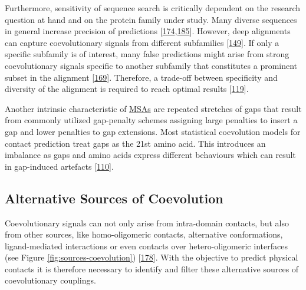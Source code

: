 \documentclass[11pt,a4paper,twoside]{book}
\theoremstyle{definition}
\theoremstyle{definition}
\theoremstyle{remark}
\begin{document}
Furthermore, sensitivity of sequence search is critically dependent on
the research question at hand and on the protein family under study.
Many diverse sequences in general increase precision of predictions
{[}\protect\hyperlink{ref-Ashkenazy2009}{174},\protect\hyperlink{ref-Avila-Herrera2015a}{185}{]}.
However, deep alignments can capture coevolutionary signals from
different subfamilies {[}\protect\hyperlink{ref-Uguzzoni2017}{149}{]}.
If only a specific subfamily is of interest, many false predictions
might arise from strong coevolutionary signals specific to another
subfamily that constitutes a prominent subset in the alignment
{[}\protect\hyperlink{ref-Franceus2016}{169}{]}. Therefore, a trade-off
between specificity and diversity of the alignment is required to reach
optimal results {[}\protect\hyperlink{ref-Hopf2012}{119}{]}.

Another intrinsic characteristic of \protect\hyperlink{abbrev}{MSAs} are
repeated stretches of gaps that result from commonly utilized
gap-penalty schemes assigning large penalties to insert a gap and lower
penalties to gap extensions. Most statistical coevolution models for
contact prediction treat gaps as the 21st amino acid. This introduces an
imbalance as gaps and amino acids express different behaviours which can
result in gap-induced artefacts
{[}\protect\hyperlink{ref-Feinauer2014}{110}{]}.

\subsection{Alternative Sources of
Coevolution}\label{alternative-sources-of-coevolution}

Coevolutionary signals can not only arise from intra-domain contacts,
but also from other sources, like homo-oligomeric contacts, alternative
conformations, ligand-mediated interactions or even contacts over
hetero-oligomeric interfaces (see Figure \ref{fig:sources-coevolution})
{[}\protect\hyperlink{ref-Marks2012}{178}{]}. With the objective to
predict physical contacts it is therefore necessary to identify and
filter these alternative sources of coevolutionary couplings.
\end{document}
